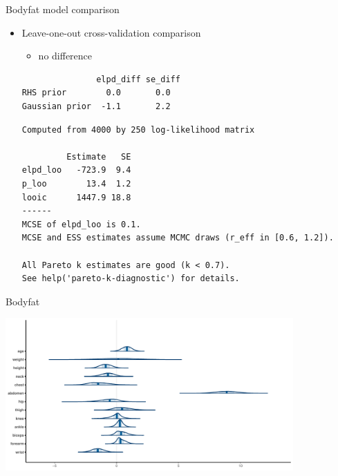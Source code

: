 \documentclass[english,t]{beamer}
\begin{document}
\begin{frame}[fragile]
  
  {\Large\color{navyblue} Bodyfat model comparison}

  \begin{itemize}
  \item Leave-one-out cross-validation comparison
    \begin{itemize}
    \item no difference
    \end{itemize}
\begin{verbatim}
               elpd_diff se_diff
RHS prior        0.0       0.0   
Gaussian prior  -1.1       2.2   
\end{verbatim}

\begin{verbatim}
Computed from 4000 by 250 log-likelihood matrix

         Estimate   SE
elpd_loo   -723.9  9.4
p_loo        13.4  1.2
looic      1447.9 18.8
------
MCSE of elpd_loo is 0.1.
MCSE and ESS estimates assume MCMC draws (r_eff in [0.6, 1.2]).

All Pareto k estimates are good (k < 0.7).
See help('pareto-k-diagnostic') for details.
\end{verbatim}

\end{itemize}

\end{frame}

\begin{frame}
  
  {\Large\color{navyblue} Bodyfat}

  
  \includegraphics[width=11cm]{bodyfat_mcmc_areas_small.pdf}

\end{frame}
\end{document}
